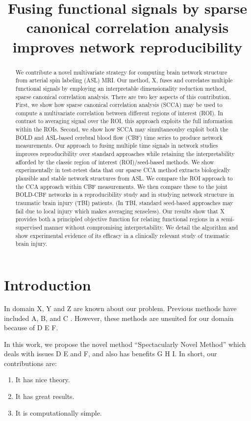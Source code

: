 \documentclass{llncs}
\title{Fusing functional signals by sparse canonical correlation analysis improves network reproducibility}
\begin{document}
\maketitle
\begin{abstract}
We contribute a novel multivariate strategy for computing brain network structure from arterial spin labeling (ASL) MRI.  Our method, X, fuses and correlates multiple functional signals by employing an interpretable dimensionality reduction method, sparse canonical correlation analysis.  There are two key aspects of this contribution.  First, we show how sparse canonical correlation analysis (SCCA) may be used to compute a multivariate correlation between different regions of interest (ROI).  In contrast to averaging signal over the ROI, this approach exploits the full information within the ROIs.  Second, we show how SCCA may simultaneoulsy exploit both the BOLD and ASL-based cerebral blood flow (CBF) time series to produce network measurements.  Our approach to fusing multiple time signals in network studies improves reproducibility over standard approaches while retaining the interpretability afforded by the classic region of interest (ROI)/seed-based methods.  We show experimentally in test-retest data that our sparse CCA method extracts biologically plausible and stable network structures from ASL.  We compare the ROI approach to the CCA approach within CBF measurements.  We then compare these to the joint BOLD-CBF networks in a reproducibility study and in studying network structure in traumatic brain injury (TBI) patients. (In TBI, standard seed-based approaches may fail due to local injury which makes averaging senseless).  Our results show that X provides both a principled objective function for relating functional regions in a semi-supervised manner without compromising interpretability.  We detail the algorithm and show experimental evidence of its efficacy in a clinically relevant study of traumatic brain injury.  
\end{abstract}

\section*{Introduction}
In domain X, Y and Z are known about our problem.  Previous methods have included A, B, and C \cite{blahblahblah}.  However, these methods are unsuited for our domain because of D E F.  

In this work, we propose the novel method ``Spectacularly Novel Method'' which deals with issues D E and F, and also has benefits G H I.  In short, our contributions are: 
\begin{enumerate}
\item It has nice theory. 
\item It has great results. 
\item It is computationally simple. 
\end{enumerate}
\end{document}
